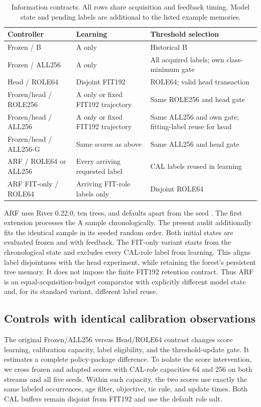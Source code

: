 \begin{table}[tb]
\centering\small
\caption{Information contracts. All rows share acquisition and feedback timing. Model state and pending labels are additional to the listed example memories.}
\label{tab:contracts}
\begin{tabularx}{\linewidth}{lXX}
\toprule
Controller & Learning & Threshold selection \\
\midrule
Frozen / B & A only & Historical B \\
Frozen / ALL256 & A only & All acquired labels; own class-minimum gate \\
Head / ROLE64 & Disjoint FIT192 & ROLE64; valid head transaction \\
Frozen/head / ROLE256 & A only or fixed FIT192 trajectory & Same ROLE256 and head gate \\
Frozen/head / ALL256 & A only or fixed FIT192 trajectory & Same ALL256 and own gate; fitting-label reuse for head \\
Frozen/head / ALL256-G & Same scores as above & Same ALL256 and head gate \\
ARF / ROLE64 or ALL256 & Every arriving requested label & CAL labels reused in learning \\
ARF FIT-only / ROLE64 & Arriving FIT-role labels only & Disjoint ROLE64 \\
\bottomrule
\end{tabularx}
\end{table}

ARF uses River 0.22.0, ten trees, and defaults apart from the seed \citep{riverdocs}. The first extension processes the A sample chronologically. The present audit additionally fits the identical sample in its seeded random order. Both initial states are evaluated frozen and with feedback. The FIT-only variant starts from the chronological state and excludes every CAL-role label from learning. This aligns label disjointness with the head experiment, while retaining the forest's persistent tree memory. It does not impose the finite FIT192 retention contract. Thus ARF is an equal-acquisition-budget comparator with explicitly different model state and, for its standard variant, different label reuse.

\subsection{Controls with identical calibration observations}
The original Frozen/ALL256 versus Head/ROLE64 contrast changes score learning, calibration capacity, label eligibility, and the threshold-update gate. It estimates a complete policy-package difference. To isolate the score intervention, we cross frozen and adapted scores with CAL-role capacities 64 and 256 on both streams and all five seeds. Within each capacity, the two scores use exactly the same labeled occurrences, age filter, objective, tie rule, and update times. Both CAL buffers remain disjoint from FIT192 and use the default role salt.

